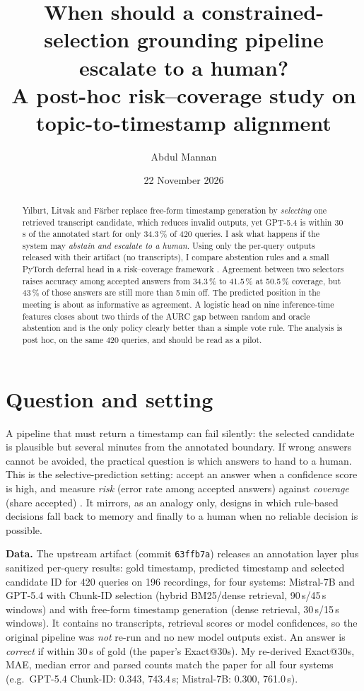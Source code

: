 \documentclass[10pt,a4paper]{article}
\title{\vspace{-1.2em}\large\textbf{When should a constrained-selection grounding pipeline escalate to a human?\\ A post-hoc risk--coverage study on topic-to-timestamp alignment}\vspace{-0.6em}}
\author{Abdul Mannan}\date{22 November 2026}
\begin{document}
\maketitle\vspace{-1.4em}
\begin{abstract}\small\noindent
Yılbırt, Litvak and Färber \cite{yilbirt} replace free-form timestamp generation by \emph{selecting} one retrieved transcript candidate, which reduces invalid outputs, yet GPT-5.4 is within 30\,s of the annotated start for only 34.3\,\% of 420 queries. I ask what happens if the system may \emph{abstain and escalate to a human}. Using only the per-query outputs released with their artifact (no transcripts), I compare abstention rules and a small PyTorch deferral head in a risk--coverage framework \cite{chow,geifman}. Agreement between two selectors raises accuracy among accepted answers from 34.3\,\% to 41.5\,\% at 50.5\,\% coverage, but 43\,\% of those answers are still more than 5\,min off. The predicted position in the meeting is about as informative as agreement. A logistic head on nine inference-time features closes about two thirds of the AURC gap between random and oracle abstention and is the only policy clearly better than a simple vote rule. The analysis is post hoc, on the same 420 queries, and should be read as a pilot.
\end{abstract}

\section{Question and setting}
A pipeline that must return a timestamp can fail silently: the selected candidate is plausible but several minutes from the annotated boundary. If wrong answers cannot be avoided, the practical question is which answers to hand to a human. This is the selective-prediction setting: accept an answer when a confidence score is high, and measure \emph{risk} (error rate among accepted answers) against \emph{coverage} (share accepted) \cite{chow,geifman}. It mirrors, as an analogy only, designs in which rule-based decisions fall back to memory and finally to a human when no reliable decision is possible.

\textbf{Data.} The upstream artifact \cite{repo} (commit \texttt{63ffb7a}) releases an annotation layer plus sanitized per-query results: gold timestamp, predicted timestamp and selected candidate ID for 420 queries on 196 recordings, for four systems: Mistral-7B and GPT-5.4 with Chunk-ID selection (hybrid BM25/dense retrieval, 90\,s/45\,s windows) and with free-form timestamp generation (dense retrieval, 30\,s/15\,s windows). It contains no transcripts, retrieval scores or model confidences, so the original pipeline was \emph{not} re-run and no new model outputs exist. An answer is \emph{correct} if within 30\,s of gold (the paper's Exact@30s). My re-derived Exact@30s, MAE, median error and parsed counts match the paper for all four systems (e.g.\ GPT-5.4 Chunk-ID: 0.343, 743.4\,s; Mistral-7B: 0.300, 761.0\,s).
\end{document}
